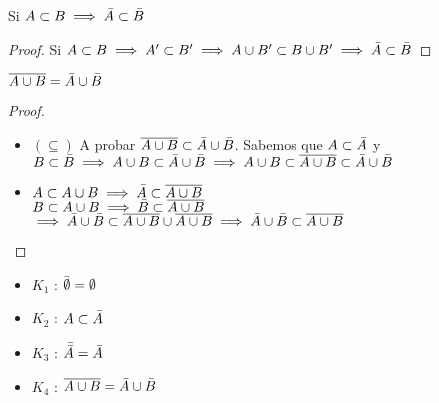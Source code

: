 \begin{proposition}
Si $A\subset B\implies \Bar{A}\subset \Bar{B}$
\end{proposition}

\begin{proof}
Si $A\subset B\implies A'\subset B'\implies A\cup B'\subset B\cup B'\implies \Bar{A}\subset \Bar{B}$
\end{proof}

\begin{proposition}
$\overline{A\cup B}=\Bar{A}\cup \Bar{B}$
\end{proposition}

\begin{proof}
\begin{itemize}
    \item $(\subseteq)$ A probar $\overline{A\cup B}\subset \Bar{A}\cup \Bar{B}$. Sabemos que $A\subset \Bar{A}$ y $B\subset \Bar{B}\implies A\cup B\subset \Bar{A}\cup \Bar{B}\implies A\cup B\subset \overline{A\cup B}\subset \Bar{A}\cup \Bar{B}$
    \item $A\subset A\cup B \implies \Bar{A}\subset \overline{A\cup B}$\\
          $B\subset A\cup B \implies \Bar{B}\subset \overline{A\cup B}$\\
          $\implies \Bar{A}\cup\Bar{B}\subset \overline{A\cup B}\cup \overline{A\cup B}\implies \Bar{A}\cup \Bar{B}\subset \overline{A\cup B}$
\end{itemize}
\end{proof}

\begin{remark}
\begin{itemize}
    \item $K_1$ : $\Bar{\emptyset}=\emptyset$
    \item $K_2$ : $A\subset\Bar{A}$
    \item $K_3$ : $\Bar{\Bar{A}}=\Bar{A}$
    \item $K_4$ : $\overline{A\cup B}=\Bar{A}\cup \Bar{B}$
    \end{itemize}
\end{remark}

